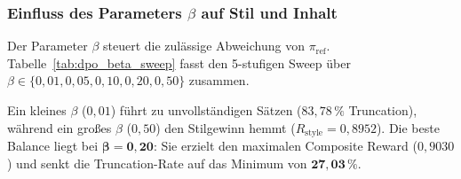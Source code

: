 \subsubsection{Einfluss des Parameters $\beta$ auf Stil und Inhalt}
\label{sec:dpo_beta_sweep}

Der Parameter $\beta$ steuert die zulässige Abweichung von $\pi_{\text{ref}}$. Tabelle~\ref{tab:dpo_beta_sweep} fasst den 5-stufigen Sweep über $\beta \in \{0{,}01, 0{,}05, 0{,}10, 0{,}20, 0{,}50\}$ zusammen.

\begin{table}[htbp]
\centering
\small
\caption[Regularisierungsparameter $\beta$ im Lebenshilfe-Test]{Einfluss des Regularisierungsparameters $\beta$ bei der direkten Präferenzoptimierung (Direct Preference Optimization, DPO) im Vergleich zur Basislinie des überwachten Feintunings (Supervised Fine-Tuning, SFT) auf dem Lebenshilfe-Testset ($N=37$ Artikelpaare) unter Auswertung von Stil-Score ($R_{\text{style}}$), semantischer Ähnlichkeit ($R_{\text{sem}}$), Composite Score, generierten Tokens und Satzabbruchquote (Truncation).}
\label{tab:dpo_beta_sweep}
\end{table}

Ein kleines $\beta$ ($0{,}01$) führt zu unvollständigen Sätzen ($83{,}78\,\%$ Truncation), während ein großes $\beta$ ($0{,}50$) den Stilgewinn hemmt ($R_{\text{style}} = 0{,}8952$). Die beste Balance liegt bei $\mathbf{\beta = 0{,}20}$: Sie erzielt den maximalen Composite Reward ($0{,}9030$) und senkt die Truncation-Rate auf das Minimum von $\mathbf{27{,}03\,\%}$.

